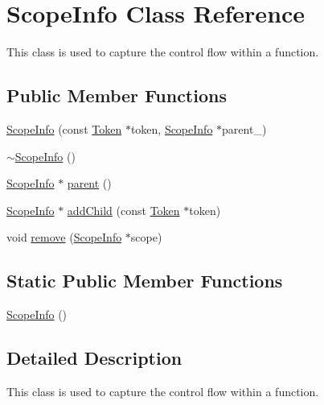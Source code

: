 \hypertarget{class_scope_info}{\section{Scope\-Info Class Reference}
\label{class_scope_info}
}


This class is used to capture the control flow within a function.  


\subsection*{Public Member Functions}
\begin{DoxyCompactItemize}
\item 
\hyperlink{class_scope_info_a6d3407926ce516c02d66290fa8628718}{Scope\-Info} (const \hyperlink{class_token}{Token} $\ast$token, \hyperlink{class_scope_info}{Scope\-Info} $\ast$parent\-\_\-)
\item 
\hyperlink{class_scope_info_af54d0909250b7762010750937e2a0570}{$\sim$\-Scope\-Info} ()
\item 
\hyperlink{class_scope_info}{Scope\-Info} $\ast$ \hyperlink{class_scope_info_a1924d2879e9db643e86e5eadb8befdba}{parent} ()
\item 
\hyperlink{class_scope_info}{Scope\-Info} $\ast$ \hyperlink{class_scope_info_a1e29f0f032b314e127457d703fed7c36}{add\-Child} (const \hyperlink{class_token}{Token} $\ast$token)
\item 
void \hyperlink{class_scope_info_aad12a01b7c2a9855f12851a779236c9c}{remove} (\hyperlink{class_scope_info}{Scope\-Info} $\ast$scope)
\end{DoxyCompactItemize}
\subsection*{Static Public Member Functions}
\begin{DoxyCompactItemize}
\item 
\hyperlink{class_scope_info_a32304cf729f351ba5a86afd152723edd}{Scope\-Info} ()
\end{DoxyCompactItemize}


\subsection{Detailed Description}
This class is used to capture the control flow within a function. 

